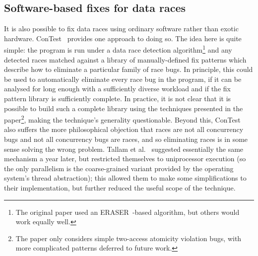 \subsection{Software-based fixes for data races}
It is also possible to fix data races using ordinary software rather
than exotic hardware.  ConTest~\cite{Krena2007} provides one approach
to doing so.  The idea here is quite simple: the program is run under
a data race detection algorithm\footnote{The original paper used an
  ERASER~\cite{Savage1997}-based algorithm, but others would work
  equally well.} and any detected races matched against a library of
manually-defined fix patterns which describe how to eliminate a
particular family of race bugs.  In principle, this could be used to
automatically eliminate every race bug in the program, if it can be
analysed for long enough with a sufficiently diverse workload and if
the fix pattern library is sufficiently complete.  In practice, it is
not clear that it is possible to build such a complete library using
the techniques presented in the paper\footnote{The paper only
  considers simple two-access atomicity violation bugs, with more
  complicated patterns deferred to future work.}\hspace{-1ex}, making the
technique's generality questionable.  Beyond this, ConTest also
suffers the more philosophical objection that races are not all
concurrency bugs and not all concurrency bugs are races, and so
eliminating races is in some sense solving the wrong problem.  Tallam
et al.~\cite{Tallam2008} suggested essentially the same mechanism a
year later, but restricted themselves to uniprocessor execution (so
the only parallelism is the coarse-grained variant provided by the
operating system's thread abstraction); this allowed them to make some
simplifications to their implementation, but further reduced the
useful scope of the technique.

